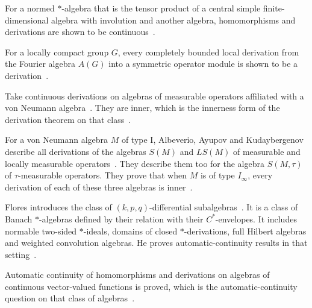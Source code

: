 For a normed $*$-algebra that is the tensor product of a central simple
finite-dimensional algebra with involution and another algebra, homomorphisms
and derivations are shown to be
continuous~\cite{WlContinuityOfHomomorphismsAndDe2019}.

For a locally compact group $G$, every completely bounded local derivation
from the Fourier algebra $A(G)$ into a symmetric operator module is shown to
be a derivation~\cite{WlBoundedAndCompletelyBoundedLoc2019}.

Take continuous derivations on algebras of measurable operators affiliated
with a von Neumann algebra~\cite{WlInnernessOfContinuousDerivatio2013}. They are inner, which is the innerness form of the
derivation theorem on that class~\cite{WlInnernessOfContinuousDerivatio2013}.

For a von Neumann algebra $M$ of type I, Albeverio, Ayupov and Kudaybergenov
describe all derivations of the algebras $S(M)$ and $LS(M)$ of measurable and
locally measurable operators~\cite{WlStructureOfDerivationsOnVariou2009}. They describe them too for the algebra
$S(M,\tau)$ of
$\tau$-measurable operators. They prove that when $M$ is of type $I_\infty$,
every derivation of each of these three algebras is
inner~\cite{WlStructureOfDerivationsOnVariou2009}.

Flores introduces the class of $(k,p,q)$-differential subalgebras~\cite{WlHarmonicAnalysisAndAutomaticCo2025}. It is a
class of
Banach $*$-algebras defined by their relation with their $C^*$-envelopes. It
includes normable two-sided $*$-ideals, domains of closed $*$-derivations,
full Hilbert algebras and weighted convolution algebras. He proves
automatic-continuity results in that
setting~\cite{WlHarmonicAnalysisAndAutomaticCo2025}.

Automatic continuity of homomorphisms and derivations on algebras of
continuous vector-valued functions is proved, which is the
automatic-continuity question on that class of
algebras~\cite{WlAutomaticContinuityOfHomomorph2020}.

